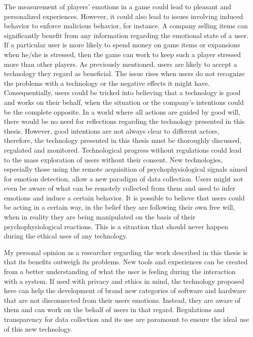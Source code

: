 The measurement of players' emotions in a game could lead to pleasant and personalized experiences. However, it could also lead to issues involving induced behavior to enforce malicious behavior, for instance. A company selling items can significantly benefit from any information regarding the emotional state of a user. If a particular user is more likely to spend money on game items or expansions when he/she is stressed, then the game can work to keep such a player stressed more than other players. As previously mentioned, users are likely to accept a technology they regard as beneficial. The issue rises when users do not recognize the problems with a technology or the negative effects it might have. Consequentially, users could be tricked into believing that a technology is good and works on their behalf, when the situation or the company's intentions could be the complete opposite. In a world where all actions are guided by good will, there would be no need for reflections regarding the technology presented in this thesis. However, good intentions are not always clear to different actors, therefore, the technology presented in this thesis must be thoroughly discussed, regulated and monitored. Technological progress without regulations could lead to the mass exploration of users without their consent. New technologies, especially those using the remote acquisition of psychophysiological signals aimed for emotion detection, allow a new paradigm of data collection. Users might not even be aware of what can be remotely collected from them and used to infer emotions and induce a certain behavior. It is possible to believe that users could be acting in a certain way, in the belief they are following their own free will, when in reality they are being manipulated on the basis of their psychophysiological reactions. This is a situation that should never happen during the ethical uses of any technology.

My personal opinion as a researcher regarding the work described in this thesis is that its benefits outweigh its problems. New tools and experiences can be created from a better understanding of what the user is feeling during the interaction with a system. If used with privacy and ethics in mind, the technology proposed here can help the development of brand new categories of software and hardware that are not disconnected from their users emotions. Instead, they are aware of them and can work on the behalf of users in that regard. Regulations and transparency for data collection and its use are paramount to ensure the ideal use of this new technology.
